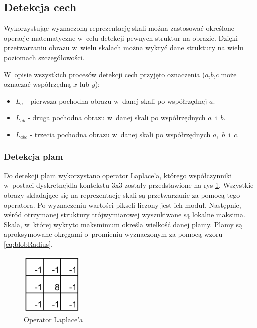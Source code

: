 \subsection{Detekcja cech}
\label{subsec:detekcja}

Wykorzystując wyznaczoną reprezentację skali można zastosować określone operacje matematyczne w~celu detekcji pewnych struktur na obrazie. Dzięki przetwarzaniu obrazu w~wielu skalach można wykryć dane struktury na wielu poziomach szczegółowości.

W~opisie wszystkich procesów detekcji cech przyjęto oznaczenia ($ a$,$ b$,$ c $ może oznaczać współrzędną $ x $ lub $ y $):

\begin{itemize}
\item $ L_a $ - pierwsza pochodna obrazu w~danej skali po współrzędnej $ a $.
\item $ L_{ab} $ - druga pochodna obrazu w~danej skali po współrzędnych $ a $~i~$b$.
\item $ L_{abc} $ - trzecia pochodna obrazu w~danej skali po współrzędnych $ a $,~$b$~i~$c$.
\end{itemize}

\subsubsection{Detekcja plam}
\label{subsubsec:detekcjaPlam}

Do detekcji plam wykorzystano operator Laplace'a, którego współczynniki w~postaci dyskretnejdla kontekstu 3x3 zostały przedstawione na rys \ref{fig:laplacian_kernel}. Wszystkie obrazy składające się na reprezentację skali są przetwarzanie za pomocą tego operatora. Po wyznaczeniu wartości pikseli liczony jest ich moduł. Następnie, wśród otrzymanej struktury trójwymiarowej wyszukiwane są lokalne maksima. Skala, w~której wykryto maksmimum określa wielkość danej plamy. Plamy są aproksymowane okręgami o~promieniu wyznaczonym za pomocą wzoru \eqref{eq:blobRadius}.

\begin{figure}
\begin{center}
\includegraphics[width=3cm]{laplacian.pdf}
\end{center}
\caption{Operator Laplace'a}
\label{fig:laplacian_kernel}
\end{figure}

